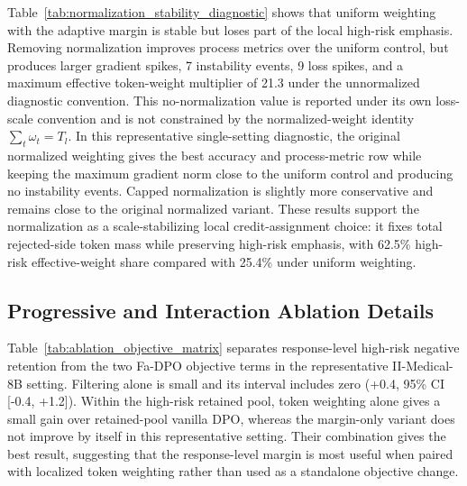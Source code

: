 \documentclass[a4paper,fleqn,doubleblind]{cas-sc}
\begin{document}
Table~\ref{tab:normalization_stability_diagnostic} shows that uniform weighting with the adaptive margin is stable but loses part of the local high-risk emphasis. Removing normalization improves process metrics over the uniform control, but produces larger gradient spikes, 7 instability events, 9 loss spikes, and a maximum effective token-weight multiplier of 21.3 under the unnormalized diagnostic convention. This no-normalization value is reported under its own loss-scale convention and is not constrained by the normalized-weight identity $\sum_t\omega_t=T_l$. In this representative single-setting diagnostic, the original normalized weighting gives the best accuracy and process-metric row while keeping the maximum gradient norm close to the uniform control and producing no instability events. Capped normalization is slightly more conservative and remains close to the original normalized variant. These results support the normalization as a scale-stabilizing local credit-assignment choice: it fixes total rejected-side token mass while preserving high-risk emphasis, with 62.5\% high-risk effective-weight share compared with 25.4\% under uniform weighting.

\subsection{Progressive and Interaction Ablation Details}
\label{app:ablation_details}

Table~\ref{tab:ablation_objective_matrix} separates response-level high-risk negative retention from the two Fa-DPO objective terms in the representative II-Medical-8B setting. Filtering alone is small and its interval includes zero (+0.4, 95\% CI [-0.4, +1.2]). Within the high-risk retained pool, token weighting alone gives a small gain over retained-pool vanilla DPO, whereas the margin-only variant does not improve by itself in this representative setting. Their combination gives the best result, suggesting that the response-level margin is most useful when paired with localized token weighting rather than used as a standalone objective change.
\end{document}
